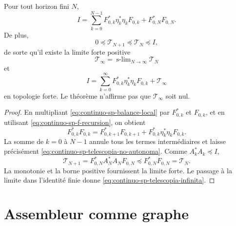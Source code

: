 \begin{theorem}
\label{thm:continuo-sp-telescopia-no-autonoma}
Pour tout horizon fini \(N\),
\begin{equation}
\label{eq:continuo-sp-telescopia-no-autonoma}
 \boxed{
 I=\sum_{k=0}^{N-1}
 F_{0,k}^*\eta_k^*\eta_kF_{0,k}
 +F_{0,N}^*F_{0,N}.}
\end{equation}
De plus,
\[
 0\preceq\mathcal T_{N+1}
 \preceq\mathcal T_N\preceq I,
\]
de sorte qu'il existe la limite forte positive
\[
 \mathcal T_\infty
 =\operatorname{s-lim}_{N\to\infty}\mathcal T_N
\]
et
\begin{equation}
\label{eq:continuo-sp-telescopia-infinita}
 I=\sum_{k=0}^{\infty}
 F_{0,k}^*\eta_k^*\eta_kF_{0,k}
 +\mathcal T_\infty
\end{equation}
en topologie forte. Le théorème n'affirme pas que
\(\mathcal T_\infty\) soit nul.
\end{theorem}

\begin{proof}
En multipliant \eqref{eq:continuo-sp-balance-local} par
\(F_{0,k}^*\) et \(F_{0,k}\), et en utilisant
\eqref{eq:continuo-sp-f-recursion}, on obtient
\[
 F_{0,k}^*F_{0,k}
 =F_{0,k+1}^*F_{0,k+1}
  +F_{0,k}^*\eta_k^*\eta_kF_{0,k}.
\]
La somme de \(k=0\) à \(N-1\) annule tous les termes
intermédiaires et laisse précisément
\eqref{eq:continuo-sp-telescopia-no-autonoma}. Comme
\(A_k^*A_k\preceq I\),
\[
 \mathcal T_{N+1}
 =F_{0,N}^*A_N^*A_NF_{0,N}
 \preceq F_{0,N}^*F_{0,N}=\mathcal T_N.
\]
La monotonie et la borne positive fournissent la limite forte. Le passage à la
limite dans l'identité finie donne
\eqref{eq:continuo-sp-telescopia-infinita}.
\end{proof}

\section{Assembleur comme graphe}

